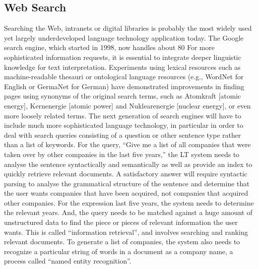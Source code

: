 \documentclass[]{../metanetpaper}
\begin{document}
	\subsection{Web Search}
Searching the Web, intranets or digital libraries is probably the most widely used yet largely underdeveloped language technology application today. The Google search engine, which started in 1998, now handles about 80%
For more sophisticated information requests, it is essential to integrate deeper linguistic knowledge for text interpretation. Experiments using lexical resources such as machine-readable thesauri or ontological language resources (e.g., WordNet for English or GermaNet for German) have demonstrated improvements in finding pages using synonyms of the original search terms, such as Atomkraft [atomic energy], Kernenergie [atomic power] and Nuklearenergie [nuclear energy], or even more loosely related terms. 
The next generation of search engines will have to include much more sophisticated language technology, in particular in order to deal with search queries consisting of a question or other sentence type rather than a list of keywords. For the query, “Give me a list of all companies that were taken over by other companies in the last five years,” the LT system needs to analyse the sentence syntactically and semantically as well as provide an index to quickly retrieve relevant documents. A satisfactory answer will require syntactic parsing to analyse the grammatical structure of the sentence and determine that the user wants companies that have been acquired, not companies that acquired other companies. For the expression last five years, the system needs to determine the relevant years. And, the query needs to be matched against a huge amount of unstructured data to find the piece or pieces of relevant information the user wants. This is called “information retrieval”, and involves searching and ranking relevant documents. To generate a list of companies, the system also needs to recognize a particular string of words in a document as a company name, a process called “named entity recognition”.
\end{document}
